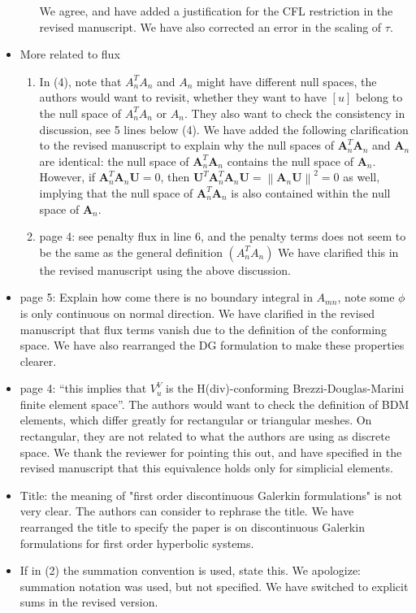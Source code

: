 \documentclass[10pt]{article}
\newcommand{\nor}[1]{\left\| #1 \right\|}
\newcommand{\note}[1]{{\color{blue}#1}}
\begin{document}
\begin{itemize}
\begin{enumerate}
\note{We agree, and have added a justification for the CFL restriction in the revised manuscript.  We have also corrected an error in the scaling of $\tau$.}
\end{enumerate}
\item More related to flux
\begin{enumerate}
\item In (4), note that $A_n^TA_n$ and $A_n$ might have different null spaces, the authors would want to revisit, whether they want to have $[u]$ belong to the null space of $A_n^TA_n$ or $A_n$.  They also want to check the consistency in discussion, see 5 lines below (4).
\note{We have added the following clarification to the revised manuscript to explain why the null spaces of $\bm{A}_n^T\bm{A}_n$ and $\bm{A}_n$ are identical: the null space of $\bm{A}_n^T\bm{A}_n$ contains the null space of $\bm{A}_n$.  However, if $\bm{A}_n^T\bm{A}_n\bm{U} = 0$, then $\bm{U}^T\bm{A}_n^T\bm{A}_n\bm{U} = \nor{\bm{A}_n\bm{U}}^2 = 0$ as well, implying that the null space of $\bm{A}_n^T\bm{A}_n$ is also contained within the null space of $\bm{A}_n$. 
}
\item page 4: see penalty flux in line 6, and the penalty terms does not seem to be the same as the general definition $(A_n^T A_n)$
\note{We have clarified this in the revised manuscript using the above discussion.}
\end{enumerate}
\item page 5: Explain how come there is no boundary integral in $A_{mn}$, note some $\phi$ is only continuous on normal direction.
\note{We have clarified in the revised manuscript that flux terms vanish due to the definition of the conforming space.  We have also rearranged the DG formulation to make these properties clearer. }
\item page 4: ``this implies that $V_u^V$ is the H(div)-conforming Brezzi-Douglas-Marini finite element space''. The authors would want to check the definition of BDM elements, which differ greatly for rectangular or triangular meshes. On rectangular, they are not related to what the authors are using as discrete space.  
\note{We thank the reviewer for pointing this out, and have specified in the revised manuscript that this equivalence holds only for simplicial elements.}
\item Title: the meaning of "first order discontinuous Galerkin formulations" is not very clear. The authors can consider to rephrase the title.
\note{We have rearranged the title to specify the paper is on discontinuous Galerkin formulations for first order hyperbolic systems.}
\item If in (2) the summation convention is used, state this.
\note{We apologize: summation notation was used, but not specified.  We have switched to explicit sums in the revised version.}
\end{itemize}
\end{document}
